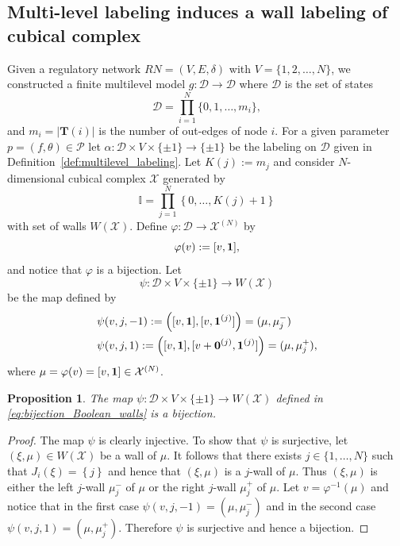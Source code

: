 \documentclass[12pt, notitlepage]{amsart}
\newcommand{\setof}[1]{\left\{ {#1}\right\}}
\newcommand{\I}{{\mathbb{I}}}
\newcommand{\cD}{\mathcal{D}}
\newcommand{\cP}{{\mathcal P}}
\newcommand{\cX}{{\mathcal X}}
\newtheorem{prop}[thm]{Proposition}
\theoremstyle{definition}
\newcommand{\Targets}{\mathbf{T}}
\begin{document}
  \subsection{Multi-level labeling induces a wall labeling of cubical complex}
  \label{sec:label_wall_label}

  Given a regulatory network $RN = (V, E, \delta)$ with $V = \{ 1, 2, \ldots, N \}$, we constructed a finite multilevel model $g \colon \cD \to \cD$ where $\cD$ is the set of states
  \[
    \mathcal{D} = \prod_{i = 1}^N \{0, 1, \ldots, m_i\},
  \]
  and $m_i = | \Targets(i) |$ is the number of out-edges of node $i$. For a given parameter $p = (f, \theta) \in \cP$ let $\alpha \colon \cD \times V \times \{ \pm 1\} \to \{\pm 1\}$ be the labeling on $\cD$ given in Definition~\ref{def:multilevel_labeling}.
  Let $K(j) := m_j$ and consider $N$-dimensional cubical complex $\cX$ generated by
  \[
    \I = \prod_{j=1}^N \setof{0, \ldots, K(j) + 1}
  \]
  with set of walls $W(\cX)$. Define $\varphi \colon \cD \to \cX^{(N)}$ by
  \[
    \varphi(v) := [v, {\bf 1}],
  \]
  and notice that $\varphi$ is a bijection. Let
  \begin{equation}
    \label{eq:bijection_Boolean_walls}
    \psi \colon \cD \times V \times \{ \pm 1\} \to W(\cX)
  \end{equation}
  be the map defined by
  \begin{align*}
    & \psi (v, j, -1) := \left( [v, {\bf 1}], [v, {\bf 1}^{(j)}] \right) = (\mu, \mu_j^-) \\
    & \psi (v, j, 1) := \left( [v, {\bf 1}], [v + {\bf 0}^{(j)}, {\bf 1}^{(j)}] \right) = (\mu, \mu_j^+),
  \end{align*}
  where $\mu = \varphi(v) = [v, {\bf 1}] \in \cX^{(N)}$.

  \begin{prop}
    The map $\psi \colon \cD \times V \times \{ \pm 1\} \to W(\cX)$ defined in \eqref{eq:bijection_Boolean_walls} is a bijection.
  \end{prop}

  \begin{proof}
    The map $\psi$ is clearly injective. To show that $\psi$ is surjective, let $(\xi, \mu) \in W(\cX)$ be a wall of $\mu$. It follows that there exists $j \in \{ 1, \ldots, N \}$ such that $J_i(\xi) = \setof{j}$ and hence that $(\xi, \mu)$ is a $j$-wall of $\mu$. Thus $(\xi, \mu)$ is either the left $j$-wall $\mu_j^-$ of $\mu$ or the right $j$-wall $\mu_j^+$ of $\mu$. Let $v = \varphi^{-1}(\mu)$ and notice that in the first case $\psi (v, j, -1) = (\mu, \mu_j^-)$ and in the second case $\psi (v, j, 1) = (\mu, \mu_j^+)$. Therefore $\psi$ is surjective and hence a bijection.
  \end{proof}
\end{document}
